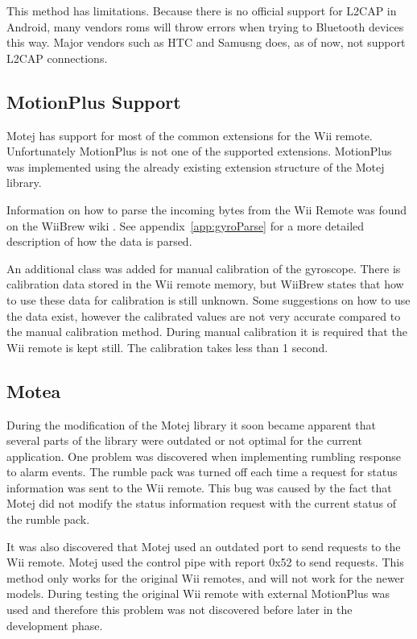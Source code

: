 This method has limitations. Because there is no official support for L2CAP in Android, many vendors roms will throw errors when trying to Bluetooth devices this way. Major vendors such as HTC and Samusng does, as of now, not support L2CAP connections.

\subsection{MotionPlus Support}
Motej has support for most of the common extensions for the Wii remote. Unfortunately MotionPlus is not one of the supported extensions. MotionPlus was implemented using the already existing extension structure of the Motej library.

Information on how to parse the incoming bytes from the Wii Remote was found on the WiiBrew wiki \cite{wiiBrew}. See appendix~\ref{app:gyroParse} for a more detailed description of how the data is parsed. 

An additional class was added for manual calibration of the gyroscope. There is calibration data stored in the Wii remote memory, but WiiBrew states that how to use these data for calibration is still unknown. Some suggestions on how to use the data exist, however the calibrated values are not very accurate compared to the manual calibration method. During manual calibration it is required that the Wii remote is kept still. The calibration takes less than 1 second.

\subsection{Motea}
\label{sec:motea}
During the modification of the Motej library it soon became apparent that several parts of the library were outdated or not optimal for the current application. One problem was discovered when implementing rumbling response to alarm events. The rumble pack was turned off each time a request for status information was sent to the Wii remote. This bug was caused by the fact that Motej did not modify the status information request with the current status of the rumble pack.

It was also discovered that Motej used an outdated port to send requests to the Wii remote. Motej used the control pipe with report 0x52 to send requests. This method only works for the original Wii remotes, and will not work for the newer models. During testing the original Wii remote with external MotionPlus was used and therefore this problem was not discovered before later in the development phase.

